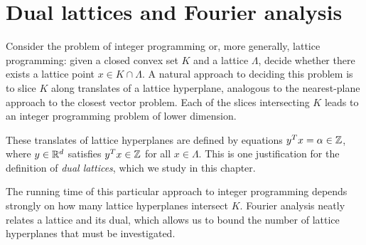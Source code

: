 %
%
%

\chapter{Dual lattices and Fourier analysis}
\label{chapter:dual-lattices}

Consider the problem of integer programming or, more generally, lattice programming:
given a closed convex set $K$ and a lattice $\Lambda$,
decide whether there exists a lattice point $x \in K \cap \Lambda$.
A natural approach to deciding this problem
is to slice $K$ along translates of a lattice hyperplane,
analogous to the nearest-plane approach to the closest vector problem.
Each of the slices intersecting $K$ leads to an integer programming problem
of lower dimension.
\begin{center}
\end{center}
These translates of lattice hyperplanes are defined by equations $y^Tx = \alpha \in \mathbb{Z}$,
where $y \in \mathbb{R}^d$ satisfies $y^Tx \in \mathbb{Z}$ for all $x \in \Lambda$.
This is one justification for the definition of \emph{dual lattices},
which we study in this chapter.

The running time of this particular approach to integer programming
depends strongly on how many lattice hyperplanes intersect $K$.
Fourier analysis neatly relates a lattice and its dual,
which allows us to bound the number of lattice hyperplanes that must be investigated.


